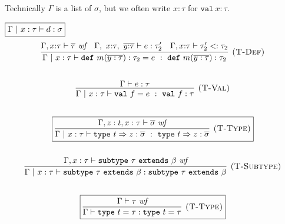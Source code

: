 \documentclass{article}
\newcommand{\keywadj}[1]{\mathtt{#1}}
\newcommand{\keyw}[1]{\keywadj{#1}~}
\begin{document}
%  
%
%  
%

Technically $\Gamma$ is a list of $\sigma$, but we often write $x:\tau$ for $\keyw{val} x:\tau$.

$\fbox{$\Gamma ~|~ x:\tau \vdash d : \sigma$}$
\[
\begin{array}{c}
\infer[\textsc{(T-Def)}]
  {\Gamma  ~|~ x:\tau \vdash \keyw{def} m(\overline{y : \tau}) : \tau_2 = e~:~\keyw{def} m(\overline{y : \tau}) : \tau_2}
  {\Gamma, x{:}\tau \vdash \overline{\tau}~\textit{wf} & \Gamma,~x{:}\tau,~\overline{y{:}\tau} \vdash e : \tau_2' & \Gamma, x{:}\tau \vdash \tau_2' <: \tau_2}\\[5ex]

\infer[\textsc{(T-Val)}]
  {\Gamma ~|~ x:\tau \vdash \keyw{val} f = e~:~\keyw{val} f : \tau}
  {\Gamma \vdash e : \tau}\\[5ex]

\boxed{\infer[\textsc{(T-Type)}]
  {\Gamma ~|~ x:\tau \vdash \keyw{type} t \Rightarrow z:\overline\sigma ~:~ \keyw{type} t \Rightarrow z:\overline\sigma}
  {\Gamma, z: t, x:\tau \vdash \overline\sigma~\textit{wf}}
}\\[5ex]

\infer[\textsc{(T-Subtype)}]
  {\Gamma ~|~ x:\tau \vdash \keyw{subtype} \tau ~\keyw{extends} \beta : \keyw{subtype} \tau ~\keyw{extends} \beta}
  {\Gamma, x:\tau \vdash \keyw{subtype} \tau ~\keyw{extends} \beta~\textit{wf}}\\[5ex]
 

\boxed{\infer[\textsc{(T-Type)}]
  {\Gamma \vdash \keyw{type} t = \tau : \keyw{type} t = \tau}
  {\Gamma \vdash \tau ~\textit{wf}}
}\\[5ex]  
\end{array}
\]
\end{document}
